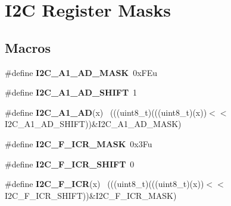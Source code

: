 \hypertarget{group___i2_c___register___masks}{}\section{I2\+C Register Masks}
\label{group___i2_c___register___masks}
\subsection*{Macros}
\begin{DoxyCompactItemize}
\item 
\hypertarget{group___i2_c___register___masks_gad90fbd42f33b89ff3296c52700771b1b}{}\#define {\bfseries I2\+C\+\_\+\+A1\+\_\+\+A\+D\+\_\+\+M\+A\+S\+K}~0x\+F\+Eu\label{group___i2_c___register___masks_gad90fbd42f33b89ff3296c52700771b1b}

\item 
\hypertarget{group___i2_c___register___masks_gaf074658893634b95a9858ee29bbdd88a}{}\#define {\bfseries I2\+C\+\_\+\+A1\+\_\+\+A\+D\+\_\+\+S\+H\+I\+F\+T}~1\label{group___i2_c___register___masks_gaf074658893634b95a9858ee29bbdd88a}

\item 
\hypertarget{group___i2_c___register___masks_ga546cc5fdf8c77c06ffefcdf0a69c1f65}{}\#define {\bfseries I2\+C\+\_\+\+A1\+\_\+\+A\+D}(x)                                                      ~(((uint8\+\_\+t)(((uint8\+\_\+t)(x))$<$$<$I2\+C\+\_\+\+A1\+\_\+\+A\+D\+\_\+\+S\+H\+I\+F\+T))\&I2\+C\+\_\+\+A1\+\_\+\+A\+D\+\_\+\+M\+A\+S\+K)\label{group___i2_c___register___masks_ga546cc5fdf8c77c06ffefcdf0a69c1f65}

\item 
\hypertarget{group___i2_c___register___masks_gaeb777a93b5695409902fb2f2b77eb760}{}\#define {\bfseries I2\+C\+\_\+\+F\+\_\+\+I\+C\+R\+\_\+\+M\+A\+S\+K}~0x3\+Fu\label{group___i2_c___register___masks_gaeb777a93b5695409902fb2f2b77eb760}

\item 
\hypertarget{group___i2_c___register___masks_ga8e2daf0de75e77e33467f6b132be0c30}{}\#define {\bfseries I2\+C\+\_\+\+F\+\_\+\+I\+C\+R\+\_\+\+S\+H\+I\+F\+T}~0\label{group___i2_c___register___masks_ga8e2daf0de75e77e33467f6b132be0c30}

\item 
\hypertarget{group___i2_c___register___masks_gafc6c8fefa2930785f203c98adee6f089}{}\#define {\bfseries I2\+C\+\_\+\+F\+\_\+\+I\+C\+R}(x)                                                      ~(((uint8\+\_\+t)(((uint8\+\_\+t)(x))$<$$<$I2\+C\+\_\+\+F\+\_\+\+I\+C\+R\+\_\+\+S\+H\+I\+F\+T))\&I2\+C\+\_\+\+F\+\_\+\+I\+C\+R\+\_\+\+M\+A\+S\+K)\label{group___i2_c___register___masks_gafc6c8fefa2930785f203c98adee6f089}


\end{DoxyCompactItemize}
